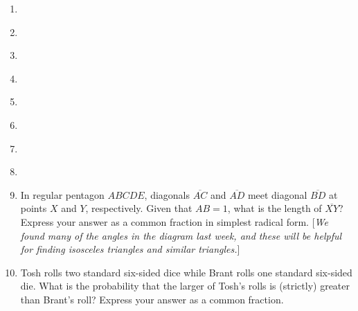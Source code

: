 \documentclass{article}
\begin{document}
\begin{enumerate}
\item \underline{\hspace{3in}}\vspace{1cm}
\item \underline{\hspace{3in}}\vspace{1cm}
\item \underline{\hspace{3in}}\vspace{1cm}
\item \underline{\hspace{3in}}\vspace{1cm}
\item \underline{\hspace{3in}}\vspace{1cm}
\item \underline{\hspace{3in}}\vspace{1cm}
\item \underline{\hspace{3in}}\vspace{1cm}
\item \underline{\hspace{3in}}\vspace{1cm}
\item In regular pentagon $ABCDE$, diagonals $\overline{AC}$ and $\overline{AD}$ meet diagonal $\overline{BD}$ at points $X$ and $Y$, respectively. Given that $AB = 1$, what is the length of $\overline{XY}$? Express your answer as a common fraction in simplest radical form. [\emph{We found many of the angles in the diagram last week, and these will be helpful for finding isosceles triangles and similar triangles.}]
\vspace{1cm}
\item Tosh rolls two standard six-sided dice while Brant rolls one standard six-sided die. What is the probability that the larger of Tosh's rolls is (strictly) greater than Brant's roll? Express your answer as a common fraction.
\end{enumerate}


\newpage
\end{document}
